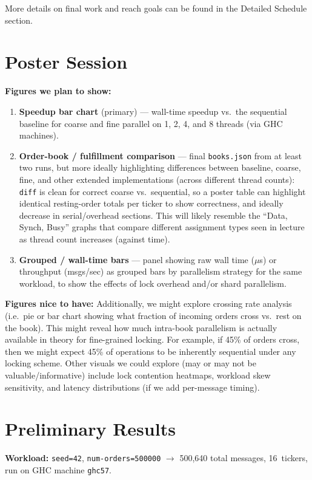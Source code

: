 \documentclass[11pt]{article}
\begin{document}
More details on final work and reach goals can be found in the Detailed Schedule section.

\section*{Poster Session}

\textbf{Figures we plan to show:}
\begin{enumerate}
    \item \textbf{Speedup bar chart} (primary) --- wall-time speedup vs.\ the sequential baseline for coarse and fine parallel on 1, 2, 4, and 8 threads (via GHC machines).
    \item \textbf{Order-book / fulfillment comparison} --- final \texttt{books.json} from at least two runs, but more ideally highlighting differences between baseline, coarse, fine, and other extended implementations (across different thread counts): \texttt{diff} is clean for correct coarse vs.\ sequential, so a poster table can highlight identical resting-order totals per ticker to show correctness, and ideally decrease in serial/overhead sections. This will likely resemble the ``Data, Synch, Busy'' graphs that compare different assignment types seen in lecture as thread count increases (against time).
    \item \textbf{Grouped / wall-time bars} --- panel showing raw wall time ($\mu$s) or throughput (msgs/sec) as grouped bars by parallelism strategy for the same workload, to show the effects of lock overhead and/or shard parallelism.
\end{enumerate}

\textbf{Figures nice to have:}
Additionally, we might explore crossing rate analysis (i.e.\ pie or bar chart showing what fraction of incoming orders cross vs.\ rest on the book). This might reveal how much intra-book parallelism is actually available in theory for fine-grained locking. For example, if 45\% of orders cross, then we might expect 45\% of operations to be inherently sequential under any locking scheme. Other visuals we could explore (may or may not be valuable/informative) include lock contention heatmaps, workload skew sensitivity, and latency distributions (if we add per-message timing).

\section*{Preliminary Results}

\textbf{Workload:} \texttt{seed=42}, \texttt{num-orders=500000} $\rightarrow$ 500,640 total messages, 16~tickers, run on GHC machine \texttt{ghc57}.
\end{document}
